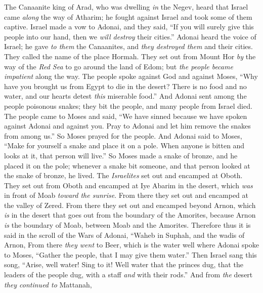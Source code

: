 \begin{biblechapter} %
 The Canaanite king of Arad, who was dwelling \textit{in} the Negev, heard that Israel came \textit{along} the way of Atharim; he fought against Israel and took some of them captive.
\verse Israel made a vow to Adonai, and they said, “If you will surely give this people into our hand, then we \textit{will destroy} their cities.”
\verse Adonai heard the voice of Israel; he gave \textit{to them} the Canaanites, and \textit{they destroyed them} and their cities. They called the name of the place Hormah.
\verse They set out from Mount Hor \textit{by} the way of the \textit{Red Sea} to go around the land of Edom; but \textit{the people became impatient} along the way.
\verse The people spoke against God and against Moses, “Why have you brought us from Egypt to die in the desert? There is no food and no water, and our hearts detest \textit{this} miserable food.”
 And Adonai sent among the people poisonous snakes; they bit the people, and many people from Israel died.
\verse The people came to Moses and said, “We have sinned because we have spoken against Adonai and against you. Pray to Adonai and let him remove the snakes from among us.” So Moses prayed for the people.
\verse And Adonai said to Moses, “Make for yourself a snake and place it on a pole. When anyone is bitten and looks at it, that person will live.”
\verse So Moses made a snake of bronze, and he placed it on the pole; whenever a snake bit someone, and that person looked at the snake of bronze, he lived.
\verse The \textit{Israelites} set out and encamped at Oboth.
\verse They set out from Oboth and encamped at Iye Abarim in the desert, which \textit{was} in front of Moab \textit{toward the sunrise}.
\verse From there they set out and encamped at the valley of Zered.
\verse From there they set out and encamped beyond Arnon, which \textit{is} in the desert that goes out from the boundary of the Amorites, because Arnon \textit{is} the boundary of Moab, between Moab and the Amorites.
\verse Therefore thus it is said in the scroll of the Wars of Adonai,
\verse “Waheb in Suphah, 
and the wadis of Arnon,
\verse From there \textit{they went} to Beer, which is the water well where Adonai spoke to Moses, “Gather the people, that I may give them water.”
\verse Then Israel sang this song, “Arise, well water! Sing to it!
\verse Well water that the princes dug, that the leaders of the people dug, with a staff \textit{and} with their rods.” And from \textit{the} desert \textit{they continued to} Mattanah,

\end{biblechapter}
